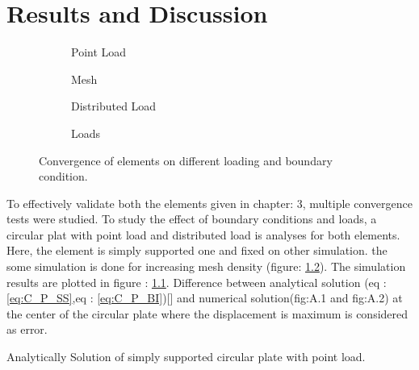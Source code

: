 \documentclass[main.tex]{subfiles}
\begin{document}
\chapter{Results and Discussion}


\begin{figure}[h!]
\centering
\begin{subfigure}[t]{0.75\textwidth}



\caption{Point Load}
\label{fig:C_P}
\end{subfigure} \hfill
\begin{subfigure}[t]{0.24\textwidth}



\caption{Mesh}
\label{fig:Mesh_Density}
\end{subfigure}
\vfill
\vspace{1cm}

\begin{subfigure}[t]{0.75\textwidth}
\centering


\caption{Distributed Load}
\label{fig:C_q}
\end{subfigure} \hfill
\begin{subfigure}[t]{0.24\textwidth}
\centering


\caption{Loads}
\label{fig:Load_P_q}
\end{subfigure}
\vspace{1cm}
\caption{Convergence of elements on different loading and boundary condition.}
\end{figure} \par

To effectively validate both the elements given in chapter: 3, multiple convergence tests were studied. To study the effect of boundary conditions and loads, a circular plat with point load and distributed load is analyses for both elements. Here,  the element is simply supported one and fixed on other simulation. the some simulation is done for increasing mesh density (figure:  \ref{fig:Mesh_Density}). The simulation results are plotted in figure : \ref{fig:C_P}. Difference between analytical solution (eq :\ref{eq:C_P_SS},eq : \ref{eq:C_P_BI})[\cite{TIMOPLATES}] and numerical solution(fig:A.1 and fig:A.2) at the center of the circular plate where the displacement is maximum is considered as error. \par
Analytically Solution of simply supported circular plate with point load.
\end{document}
